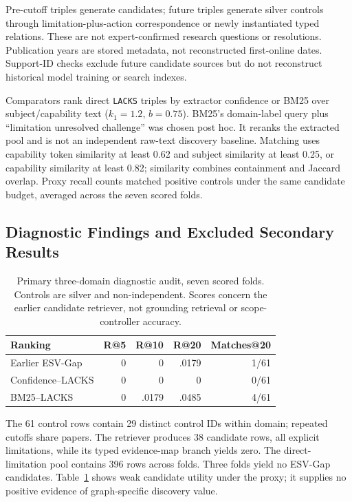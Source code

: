 \documentclass[runningheads]{llncs}
\begin{document}
Pre-cutoff triples generate candidates; future triples generate silver controls through limitation-plus-action correspondence or newly instantiated typed relations. These are not expert-confirmed research questions or resolutions. Publication years are stored metadata, not reconstructed first-online dates. Support-ID checks exclude future candidate sources but do not reconstruct historical model training or search indexes.

Comparators rank direct \texttt{LACKS} triples by extractor confidence or BM25 over subject/capability text ($k_1=1.2$, $b=0.75$). BM25's domain-label query plus ``limitation unresolved challenge'' was chosen post hoc. It reranks the extracted pool and is not an independent raw-text discovery baseline. Matching uses capability token similarity at least 0.62 and subject similarity at least 0.25, or capability similarity at least 0.82; similarity combines containment and Jaccard overlap. Proxy recall counts matched positive controls under the same candidate budget, averaged across the seven scored folds.

\subsection{Diagnostic Findings and Excluded Secondary Results}
\begin{table}[t]
\caption{Primary three-domain diagnostic audit, seven scored folds. Controls are silver and non-independent. Scores concern the earlier candidate retriever, not grounding retrieval or scope-controller accuracy.}
\label{tab:macro}
\centering\small
\begin{tabular}{lrrrr}
\toprule
Ranking & R@5 & R@10 & R@20 & Matches@20 \\
\midrule
Earlier ESV-Gap & 0 & 0 & .0179 & 1/61 \\
Confidence--LACKS & 0 & 0 & 0 & 0/61 \\
BM25--LACKS & 0 & .0179 & .0485 & 4/61 \\
\bottomrule
\end{tabular}
\end{table}

The 61 control rows contain 29 distinct control IDs within domain; repeated cutoffs share papers. The retriever produces 38 candidate rows, all explicit limitations, while its typed evidence-map branch yields zero. The direct-limitation pool contains 396 rows across folds. Three folds yield no ESV-Gap candidates. Table~\ref{tab:macro} shows weak candidate utility under the proxy; it supplies no positive evidence of graph-specific discovery value.
\end{document}
